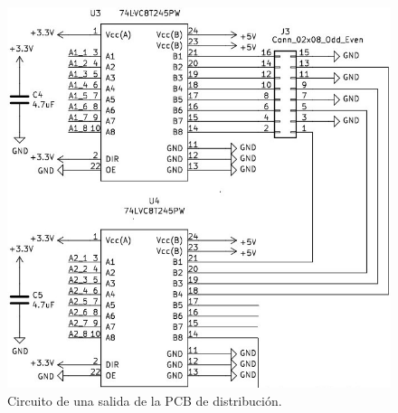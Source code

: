 \begin{figure}[htpb]
	\centering
    \includegraphics[scale=0.6]{Figures/circuitodistribucion.jpg} 
	\caption{Circuito de una salida de la PCB de distribución.}
	\label{fig:circuitodistribucion}
\end{figure}

